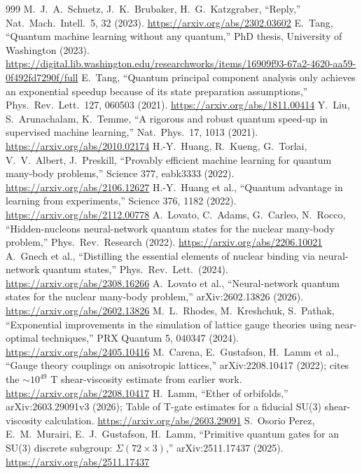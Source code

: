 \documentclass[10pt,a4paper]{article}
\begin{document}
\begin{thebibliography}{999}
 M.~J.~A.~Schuetz, J.~K.~Brubaker, H.~G.~Katzgraber, ``Reply,'' Nat.\ Mach.\ Intell.\ 5, 32 (2023). \url{https://arxiv.org/abs/2302.03602}
 E.~Tang, ``Quantum machine learning without any quantum,'' PhD thesis, University of Washington (2023). \url{https://digital.lib.washington.edu/researchworks/items/16909f93-67a2-4620-aa59-0f492fd7290f/full}
 E.~Tang, ``Quantum principal component analysis only achieves an exponential speedup because of its state preparation assumptions,'' Phys.\ Rev.\ Lett.\ 127, 060503 (2021). \url{https://arxiv.org/abs/1811.00414}
 Y.~Liu, S.~Arunachalam, K.~Temme, ``A rigorous and robust quantum speed-up in supervised machine learning,'' Nat.\ Phys.\ 17, 1013 (2021). \url{https://arxiv.org/abs/2010.02174}
 H.-Y.~Huang, R.~Kueng, G.~Torlai, V.~V.~Albert, J.~Preskill, ``Provably efficient machine learning for quantum many-body problems,'' Science 377, eabk3333 (2022). \url{https://arxiv.org/abs/2106.12627}
 H.-Y.~Huang et al., ``Quantum advantage in learning from experiments,'' Science 376, 1182 (2022). \url{https://arxiv.org/abs/2112.00778}
 A.~Lovato, C.~Adams, G.~Carleo, N.~Rocco, ``Hidden-nucleons neural-network quantum states for the nuclear many-body problem,'' Phys.\ Rev.\ Research (2022). \url{https://arxiv.org/abs/2206.10021}
 A.~Gnech et al., ``Distilling the essential elements of nuclear binding via neural-network quantum states,'' Phys.\ Rev.\ Lett.\ (2024). \url{https://arxiv.org/abs/2308.16266}
 A.~Lovato et al., ``Neural-network quantum states for the nuclear many-body problem,'' arXiv:2602.13826 (2026). \url{https://arxiv.org/abs/2602.13826}
 M.~L.~Rhodes, M.~Kreshchuk, S.~Pathak, ``Exponential improvements in the simulation of lattice gauge theories using near-optimal techniques,'' PRX Quantum 5, 040347 (2024). \url{https://arxiv.org/abs/2405.10416}
 M.~Carena, E.~Gustafson, H.~Lamm et al., ``Gauge theory couplings on anisotropic lattices,'' arXiv:2208.10417 (2022); cites the $\sim10^{49}$ T shear-viscosity estimate from earlier work. \url{https://arxiv.org/abs/2208.10417}
 H.~Lamm, ``Ether of orbifolds,'' arXiv:2603.29091v3 (2026); Table of T-gate estimates for a fiducial SU(3) shear-viscosity calculation. \url{https://arxiv.org/abs/2603.29091}
 S.~Osorio Perez, E.~M.~Murairi, E.~J.~Gustafson, H.~Lamm, ``Primitive quantum gates for an SU(3) discrete subgroup: $\Sigma(72\times3)$,'' arXiv:2511.17437 (2025). \url{https://arxiv.org/abs/2511.17437}

\end{thebibliography}
\end{document}
